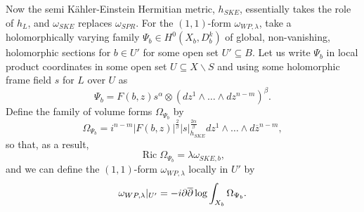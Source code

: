 \documentclass[12pt]{article}
\numberwithin{equation}{section}
\renewcommand{\d}{\partial}
\newcommand{\dbar}{\overline{\partial}}
\DeclareMathOperator{\Ric}{Ric}
\newcommand{\oo}[1]{\overline{#1}}
\begin{document}
\noindent Now the semi K\"ahler-Einstein Hermitian metric, $h_{SKE}$, essentially takes the role of $h_{L}$, and $\omega_{SKE}$ replaces $\omega_{SPR}$. For the $(1,1)$-form $\omega_{WP,\lambda}$, take a holomorphically varying family $\Psi_b \in H^0(X_b,D^k_b)$ of global, non-vanishing, holomorphic sections for $b \in U'$ for some open set $U' \subseteq B$. Let us write $\Psi_b$ in local product coordinates in some open set $U \subseteq X \backslash S$ and using some holomorphic frame field $s$ for $L$ over $U$ as
\begin{equation*}
    \Psi_b = F(b,z) s^\alpha \otimes (dz^1 \wedge \dots \wedge dz^{n-m})^\beta.
\end{equation*}
Define the family of volume forms $\Omega_{\Psi_b}$ by
\begin{equation*}
    \Omega_{\Psi_b} = i^{n-m} |F(b,z)|^{\frac{2}{\beta}}|s|^{\frac{2\alpha}{\beta}}_{h_{SKE}} dz^1 \wedge \dots \wedge d\oo{z}^{n-m},
\end{equation*}
so that, as a result,
\begin{equation*}
    \Ric \Omega_{\Psi_b} = \lambda \omega_{SKE,b},
\end{equation*}
and we can define the $(1,1)$-form $\omega_{WP,\lambda}$ locally in $U'$ by 
\begin{equation*}
    \omega_{WP,\lambda}|_{U'} = - i\d\dbar\log \int_{X_b} \Omega_{\Psi_b}.\\
\end{equation*}
\end{document}
